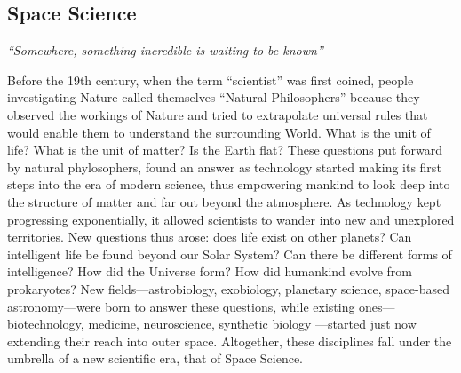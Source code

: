 \documentclass[letter,11pt]{article}
\newcommand{\attrib}[1]{\nopagebreak{\raggedleft\footnotesize #1\par}}
\begin{document}

\subsection{Space Science}
\begin{center}
\em ``Somewhere, something incredible is waiting to be known''
\end{center}
\attrib{\textbf{-- Carl Sagan\index{Sagan, Carl}}}

Before the 19th century, when the term ``scientist'' was first coined, people
investigating Nature called themselves ``Natural Philosophers'' because they
observed the workings of Nature and tried to extrapolate universal rules that
would enable them to understand the surrounding World. What is the unit of
life? What is the unit of matter? Is the Earth flat? These questions put
forward by natural phylosophers, found an answer as technology started making
its first steps into the era of modern science, thus empowering mankind to look
deep into the structure of matter and far out beyond the atmosphere. As
technology kept progressing exponentially, it allowed scientists to wander into
new and unexplored territories. New questions thus arose: does life exist on
other planets? Can intelligent life be found beyond our Solar System? Can there
be different forms of intelligence? How did the Universe form? How did
humankind evolve from prokaryotes? New fields---astrobiology, exobiology,
planetary science, space-based astronomy---were born to answer these questions,
while existing ones---biotechnology, medicine, neuroscience, synthetic biology%
---started just now extending their reach into outer space. Altogether, these
disciplines fall under the umbrella of a new scientific era, that of Space
Science.  
\end{document}
